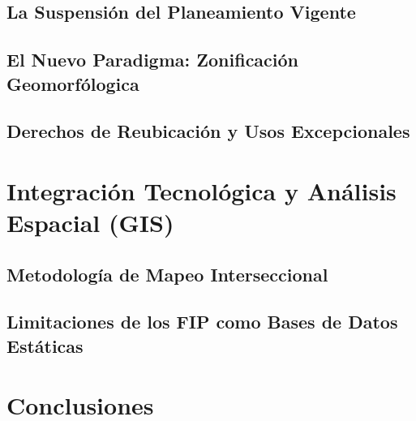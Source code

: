 \documentclass[11pt, a4paper]{article}
\begin{document}
\subsection{La Suspensión del Planeamiento Vigente}
\subsection{El Nuevo Paradigma: Zonificación Geomorfólogica}
\subsection{Derechos de Reubicación y Usos Excepcionales}

\section{Integración Tecnológica y Análisis Espacial (GIS)}
\subsection{Metodología de Mapeo Interseccional}
\subsection{Limitaciones de los FIP como Bases de Datos Estáticas}

\section{Conclusiones}
\end{document}
